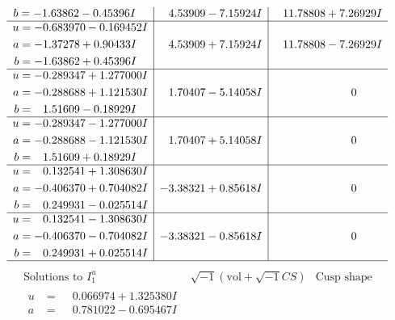 \documentclass[1p]{elsarticle_modified}
\theoremstyle{definition}
\newcommand{\I}{\sqrt{-1}}
\begin{document}
$$\begin{array}{c|c|c}
\begin{aligned}
b &= -1.63862 - 0.45396 I\end{aligned}
 & \phantom{-}4.53909 - 7.15924 I & \phantom{-}11.78808 + 7.26929 I \\ \hline\begin{aligned}
u &= -0.683970 - 0.169452 I \\
a &= -1.37278 + 0.90433 I \\
b &= -1.63862 + 0.45396 I\end{aligned}
 & \phantom{-}4.53909 + 7.15924 I & \phantom{-}11.78808 - 7.26929 I \\ \hline\begin{aligned}
u &= -0.289347 + 1.277000 I \\
a &= -0.288688 + 1.121530 I \\
b &= \phantom{-}1.51609 - 0.18929 I\end{aligned}
 & \phantom{-}1.70407 - 5.14058 I & \phantom{-0.000000 } 0 \\ \hline\begin{aligned}
u &= -0.289347 - 1.277000 I \\
a &= -0.288688 - 1.121530 I \\
b &= \phantom{-}1.51609 + 0.18929 I\end{aligned}
 & \phantom{-}1.70407 + 5.14058 I & \phantom{-0.000000 } 0 \\ \hline\begin{aligned}
u &= \phantom{-}0.132541 + 1.308630 I \\
a &= -0.406370 + 0.704082 I \\
b &= \phantom{-}0.249931 - 0.025514 I\end{aligned}
 & -3.38321 + 0.85618 I & \phantom{-0.000000 } 0 \\ \hline\begin{aligned}
u &= \phantom{-}0.132541 - 1.308630 I \\
a &= -0.406370 - 0.704082 I \\
b &= \phantom{-}0.249931 + 0.025514 I\end{aligned}
 & -3.38321 - 0.85618 I & \phantom{-0.000000 } 0\\
 \hline 
 \end{array}$$\newpage$$\begin{array}{c|c|c}  
\text{Solutions to }I^u_{1}& \I (\text{vol} + \sqrt{-1}CS) & \text{Cusp shape}\\
 \hline 
\begin{aligned}
u &= \phantom{-}0.066974 + 1.325380 I \\
a &= \phantom{-}0.781022 - 0.695467 I \\

\end{aligned}
\end{array}$$
\end{document}
